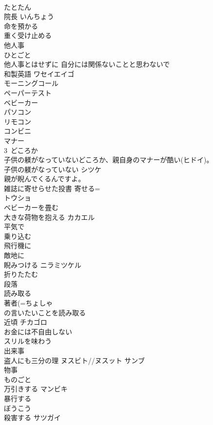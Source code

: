 \documentclass[8pt]{extreport}
\begin{document}
\begin{CJK}{UTF8}{min}
\\	たとたん 
\\	院長	いんちょう 
\\	命を預かる	
\\	重く受け止める	
\\	他人事	
\\	ひとごと
\\	他人事とはせずに	自分には関係ないことと思わないで
\\	和製英語	ワセイエイゴ 
\\	モーニングコール	
\\	ペーパーテスト	
\\	ベビーカー	
\\	パソコン	
\\	リモコン	
\\	コンビニ	
\\	マナー	
\\	3~どころか	
\\	子供の躾がなっていないどころか、親自身のマナーが酷い(ヒドイ)。
\\	子供の躾がなっていない	シツケ 
\\	親が睨んでくるんですよ。	
\\	雑誌に寄せらせた投書	寄せる=
\\	トウショ 
\\	ベビーカーを畳む	
\\	大きな荷物を抱える	カカエル 
\\	平気で	
\\	乗り込む	
\\	飛行機に 
\\	敵地に　
\\	睨みつける	ニラミツケル 
\\	折りたたむ	
\\	段落	
\\	読み取る	
\\	著者(=ちょしゃ 
\\	の言いたいことを読み取る
\\	近頃	チカゴロ 
\\	お金には不自由しない	
\\	スリルを味わう	
\\	出来事	
\\	盗人にも三分の理	ヌスビト//ヌスット サンブ 
\\	物事	
\\	ものごと
\\	万引きする	マンビキ 
\\	暴行する	
\\	ぼうこう
\\	殺害する	サツガイ 

\end{CJK}
\end{document}
